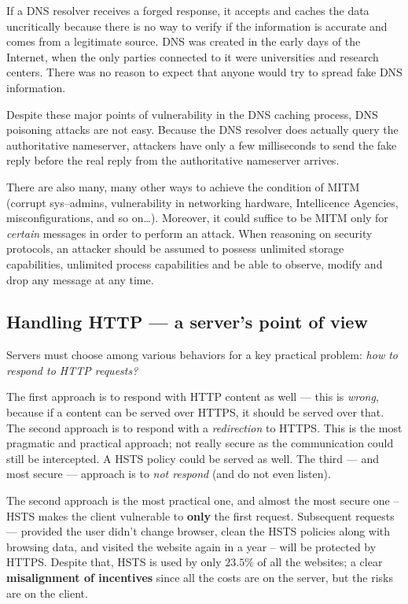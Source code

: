 \documentclass[10pt]{extreport}
\begin{document}
If a DNS resolver receives a forged response, it accepts and caches the data
uncritically because there is no way to verify if the information is accurate
and comes from a legitimate source. DNS was created in the early days of the
Internet, when the only parties connected to it were universities and research
centers. There was no reason to expect that anyone would try to spread fake DNS
information.

Despite these major points of vulnerability in the DNS caching process, DNS
poisoning attacks are not easy. Because the DNS resolver does actually query
the authoritative nameserver, attackers have only a few milliseconds to send
the fake reply before the real reply from the authoritative nameserver arrives.

There are also many, many other ways to achieve the condition of MITM (corrupt
sys--admins, vulnerability in networking hardware, Intellicence Agencies,
misconfigurations, and so on\dots). Moreover, it could suffice to be MITM only
for \emph{certain} messages in order to perform an attack. When reasoning on
security protocols, an attacker should be assumed to possess unlimited storage
capabilities, unlimited process capabilities and be able to observe, modify and
drop any message at any time.

\subsection{Handling HTTP --- a server's point of view}

Servers must choose among various behaviors for a key practical problem:
\emph{how to respond to HTTP requests?}

The first approach is to respond with HTTP content as well --- this is
\emph{wrong}, because if a content can be served over HTTPS, it should be
served over that. The second approach is to respond with a \emph{redirection}
to HTTPS. This is the most pragmatic and practical approach; not really secure
as the communication could still be intercepted. A HSTS policy could be served
as well. The third --- and most secure --- approach is to \emph{not respond} (and
do not even listen).

The second approach is the most practical one, and almost the most secure one
-- HSTS makes the client vulnerable to \textbf{only} the first request.
Subsequent requests --- provided the user didn't change browser, clean the HSTS
policies along with browsing data, and visited the website again in a year --
will be protected by HTTPS. Despite that, HSTS is used by only $23.5\%$ of all
the websites; a clear \textbf{misalignment of incentives} since all the costs
are on the server, but the risks are on the client.
\end{document}
